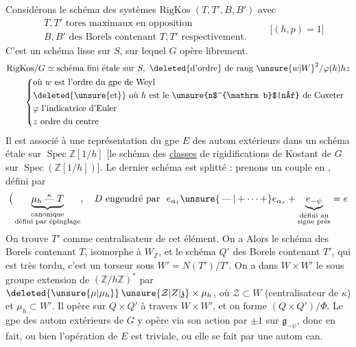 Considérons le schéma des  systèmes $\mathrm{RigKos}$ $(T,T',B,B')$ avec
\[
\begin{aligned}
&T,T' \text{ tores maximaux en opposition}\\
&B,B' \text{ des Borels contenant }T,T'\text{ respectivement.}
\end{aligned}
\qquad\big[(h,p)=1\big]
\]
C'est un schéma lisse sur $S$, sur lequel $G$ opère librement.
\[
\begin{aligned}
&\mathrm{RigKos}/G \simeq \text{schéma fini étale sur }S,\ \text{\deleted{d'ordre} de rang }{\unsure{w|W}}^2/\varphi(h)hz\\
&\hspace{2em}\left\{\begin{aligned}
&\text{où }w\text{ est l'ordre du gpe de Weyl}\\
&\text{\deleted{\unsure{et}} où }h\text{ est le \unsure{n$^{\mathrm b}$|n°} de Coxeter}\\
&\varphi\text{ l'indicatrice d'Euler}\\
&z\text{ ordre du centre}
\end{aligned}\right.
\end{aligned}
\]
Il est associé à une représentation du gpe $E$ des autom extérieurs dans un schéma  étale sur $\operatorname{Spec}\mathbb Z[1/h]$ [le schéma des \uline{classes} de rigidifications de Kostant de $G$ sur $\operatorname{Spec}(\mathbb Z[1/h])$].
Le dernier schéma est   splitté : prenons un couple en ,  défini par
\[
\big(\underbrace{\mu_h\mathrel{\overset{\kappa}{\text{---}}}T}_{\substack{\text{canonique}\\\text{défini par épinglage}}},\quad
D\text{ engendré par }\ e_{\alpha_1}\unsure{\,\text{---}\,|+\cdots+}e_{\alpha_r}+
\underbrace{e_{-\psi}}_{\substack{\text{défini au}\\\text{signe près}}}=e
\]
On trouve $T'$ comme centralisateur  de cet élément.
On a  Alors le schéma des Borels  contenant $T$, isomorphe à $W_{\mathbb Z}$, et le schéma $Q'$ des Borels contenant $T'$, qui est très tordu,  c'est un torseur sous $W'=N(T')/T'$.
On a dans $W\times W'$ le sous groupe  extension de $(\mathbb Z/h\mathbb Z)^*$ par $\deleted{\unsure{\mu|\mu_h}}\,\unsure{\mathcal Z|Z|\mathfrak z}\times\mu_h$, où $\mathcal Z\subset W$ (centralisateur de $\kappa$) et $\mu_h\subset W'$. Il opère  sur $Q\times Q'$ à travers $W\times W'$, et on forme $(Q\times Q')/\Phi$.
Le gpe des autom extérieurs  de $G$ y opère via son action par $\pm1$ sur $\mathfrak g_{-\psi}$, donc en fait,  ou bien l'opération de $E$ est triviale, ou elle se fait par une autom can.
